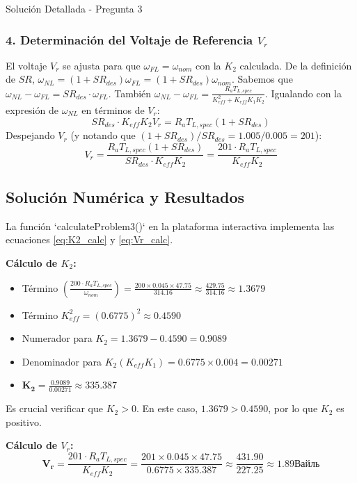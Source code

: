 \documentclass[12pt]{article}
\begin{document}
\begin{solutionbox}{Solución Detallada - Pregunta 3}
\subsubsection*{4. Determinación del Voltaje de Referencia $V_r$}
El voltaje $V_r$ se ajusta para que $\omega_{FL} = \omega_{nom}$ con la $K_2$ calculada. De la definición de $SR$, $\omega_{NL} = (1+SR_{des})\omega_{FL} = (1+SR_{des})\omega_{nom}$.
Sabemos que $\omega_{NL} - \omega_{FL} = SR_{des} \cdot \omega_{FL}$. También $\omega_{NL} - \omega_{FL} = \frac{R_a T_{L,spec}}{K_{eff}^2 + K_{eff}K_1K_2}$.
Igualando con la expresión de $\omega_{NL}$ en términos de $V_r$:
\[ SR_{des} \cdot K_{eff} K_2 V_r = R_a T_{L,spec} (1+SR_{des}) \]
Despejando $V_r$ (y notando que $(1+SR_{des})/SR_{des} = 1.005/0.005 = 201$):
\begin{equation}\label{eq:Vr_calc}
    V_r = \frac{R_a T_{L,spec} (1+SR_{des})}{SR_{des} \cdot K_{eff} K_2} = \frac{201 \cdot R_a T_{L,spec}}{K_{eff} K_2}
\end{equation}

\subsection*{Solución Numérica y Resultados}
La función `calculateProblem3()` en la plataforma interactiva implementa las ecuaciones \eqref{eq:K2_calc} y \eqref{eq:Vr_calc}.

\textbf{Cálculo de $K_2$:}
\begin{itemize}
    \item Término $\left( \frac{200 \cdot R_a T_{L,spec}}{\omega_{nom}} \right) = \frac{200 \times 0.045 \times 47.75}{314.16} \approx \frac{429.75}{314.16} \approx 1.3679$
    \item Término $K_{eff}^2 = (0.6775)^2 \approx 0.4590$
    \item Numerador para $K_2 = 1.3679 - 0.4590 = 0.9089$
    \item Denominador para $K_2 (K_{eff}K_1) = 0.6775 \times 0.004 = 0.00271$
    \item $\mathbf{K_2} = \frac{0.9089}{0.00271} \approx \mathbf{335.387}$
\end{itemize}
Es crucial verificar que $K_2 > 0$. En este caso, $1.3679 > 0.4590$, por lo que $K_2$ es positivo.

\textbf{Cálculo de $V_r$:}
\[ \mathbf{V_r} = \frac{201 \cdot R_a T_{L,spec}}{K_{eff} K_2} = \frac{201 \times 0.045 \times 47.75}{0.6775 \times 335.387} \approx \frac{431.90}{227.25} \approx \mathbf{1.89 Вайль} \]


\end{solutionbox}
\end{document}
